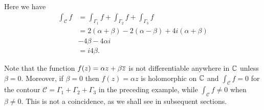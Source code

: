 \begin{solution}
\begin{center}
\end{center}
Here we have
\begin{align*}
\int_{\mathcal{C}} f & = \int_{\Gamma_1} f + \int_{\Gamma_2} f + \int_{\Gamma_3} f \\
& = 2(\alpha+\beta)-2(\alpha-\beta)+4i(\alpha+\beta)\\
&-4\beta-4\alpha i \\
& = i 4 \beta.
\end{align*}

Note that the function $f(z) =\alpha z + \beta \overline{z}$ is not differentiable anywhere in $\mathbb{C}$ unless $\beta = 0$.  Moreover, if $\beta = 0$ then $f(z)=\alpha z$ is holomorphic on $\mathbb{C}$ and $\int_{\mathcal{C}} f = 0$ for the contour $\mathcal{C}=\Gamma_1+\Gamma_2+\Gamma_3$ in the preceding example, while $\int_{\mathcal{C}} f \neq 0$ when $\beta \neq 0$.  This is not a coincidence, as we shall see in subsequent sections.
\end{solution}
